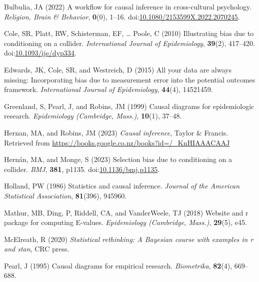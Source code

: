 \documentclass[
  singlecolumn]{article}
\newlength{\cslhangindent}
\newenvironment{CSLReferences}[2] %
 {\begin{list}{}{%
  \setlength{\itemindent}{0pt}
  \setlength{\leftmargin}{0pt}
  \setlength{\parsep}{0pt}
  \ifodd #1
   \setlength{\leftmargin}{\cslhangindent}
   \setlength{\itemindent}{-1\cslhangindent}
  \fi
  \setlength{\itemsep}{#2\baselineskip}}}
 {\end{list}}
\begin{document}
\label{refs}
\begin{CSLReferences}{1}{0}
Bulbulia, JA (2022) A workflow for causal inference in cross-cultural
psychology. \emph{Religion, Brain \& Behavior}, \textbf{0}(0), 1--16.
doi:\href{https://doi.org/10.1080/2153599X.2022.2070245}{10.1080/2153599X.2022.2070245}.

Cole, SR, Platt, RW, Schisterman, EF, \ldots{} Poole, C (2010)
Illustrating bias due to conditioning on a collider. \emph{International
Journal of Epidemiology}, \textbf{39}(2), 417--420.
doi:\href{https://doi.org/10.1093/ije/dyp334}{10.1093/ije/dyp334}.

Edwards, JK, Cole, SR, and Westreich, D (2015) All your data are always
missing: Incorporating bias due to measurement error into the potential
outcomes framework. \emph{International Journal of Epidemiology},
\textbf{44}(4), 14521459.

Greenland, S, Pearl, J, and Robins, JM (1999) Causal diagrams for
epidemiologic research. \emph{Epidemiology (Cambridge, Mass.)},
\textbf{10}(1), 37--48.

Hernan, MA, and Robins, JM (2023) \emph{Causal inference}, Taylor \&
Francis. Retrieved from
\url{https://books.google.co.nz/books?id=/_KnHIAAACAAJ}

Hernán, MA, and Monge, S (2023) Selection bias due to conditioning on a
collider. \emph{BMJ}, \textbf{381}, p1135.
doi:\href{https://doi.org/10.1136/bmj.p1135}{10.1136/bmj.p1135}.

Holland, PW (1986) Statistics and causal inference. \emph{Journal of the
American Statistical Association}, \textbf{81}(396), 945960.

Mathur, MB, Ding, P, Riddell, CA, and VanderWeele, TJ (2018) Website and
r package for computing {E}-values. \emph{Epidemiology (Cambridge,
Mass.)}, \textbf{29}(5), e45.

McElreath, R (2020) \emph{Statistical rethinking: A {B}ayesian course
with examples in r and stan}, CRC press.

Pearl, J (1995) Causal diagrams for empirical research.
\emph{Biometrika}, \textbf{82}(4), 669--688.


\end{CSLReferences}
\end{document}
